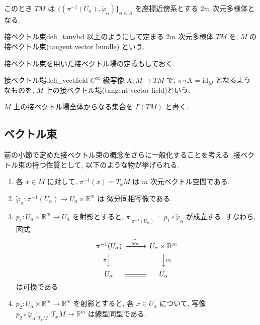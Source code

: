 \documentclass[a4paper,11pt]{ltjsarticle} %
\begin{document}
  このとき \( TM \) は 
  \( \{ (\pi^{-1} (U_{\alpha}), 
  \widetilde{\varphi} _{\alpha}) \}_{\alpha \in A} \) 
  を座標近傍系とする \( 2m \) 次元多様体となる. 

  \begin{defi}{接ベクトル束}{defi_tanvbd}
    以上のようにして定まる \( 2m \) 次元多様体 \( TM \) を, 
    \( M \) の接ベクトル束(tangent vector bundle) という. 
  \end{defi}

  接ベクトル束を用いた接ベクトル場の定義もしておく. 

  \begin{defi}{接ベクトル場}{defi_vectfield}
    \( C^{\infty} \) 級写像 \( X: M \to TM \) で, 
    \( \pi \circ X = \mathrm{id}_M \) となるようなものを, 
    \( M \) 上の接ベクトル場(tangent vector field)という. 

    \( M \) 上の接ベクトル場全体からなる集合を 
    \( \Gamma (TM) \) と書く. 
  \end{defi}

  \subsection{ベクトル束}

  前の小節で定めた接ベクトル束の概念をさらに一般化することを考える. 
  接ベクトル束の持つ性質として, 以下のような物が挙げられる. 

  \begin{enumerate}
  \item 各 \( x \in M \) に対して, \( \pi^{-1} (x) = T_x M \) は
    \( m \) 次元ベクトル空間である. 
  \item \( \widetilde{\varphi}_{\alpha} : \pi^{-1} (U_{\alpha}) 
    \to U_{\alpha} \times \mathbb{R}^m \) は
    微分同相写像である. 
  \item \( p_1: U_{\alpha} \times \mathbb{R}^m \to U_{\alpha}\)
    を射影とすると, \( \pi |_{\pi^{-1} (U_{\alpha})} 
    = p_1 \circ \widetilde{\varphi}_{\alpha} \) が成立する. すなわち, 図式
    \[
    \begin{CD}
    \pi^{-1} (U_{\alpha}) @>{\widetilde{\varphi}_{\alpha}}>> U_{\alpha} \times \mathbb{R}^m \\
    @V{\pi}VV    @VV{p_1}V \\
    U_{\alpha}   @=  U_{\alpha}
    \end{CD}
    \]
    は可換である.
  \item \( p_2: U_{\alpha} \times \mathbb{R}^m \to \mathbb{R}^m \)
    を射影とすると, 各 \( x \in U_{\alpha} \) について, 写像
    \( p_2 \circ \widetilde{\varphi}_{\alpha} |_{T_x M} : 
    T_x M \to \mathbb{R}^m \) は線型同型である. 
  \end{enumerate}
\end{document}
